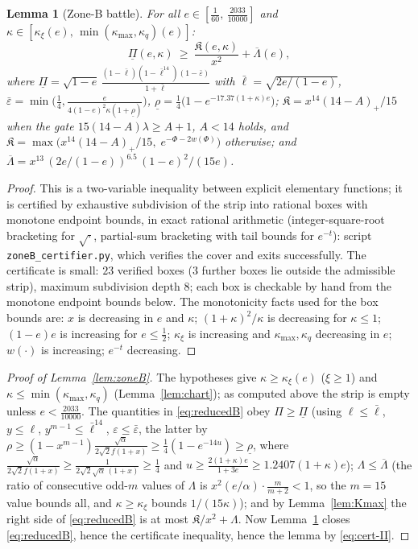 \documentclass[11pt]{article}
\newtheorem{lemma}[theorem]{Lemma}
\newcommand{\eps}{\varepsilon}
\begin{document}
\begin{lemma}[Zone-B battle]\label{lem:zoneB-battle}
For all $e\in[\tfrac1{60},\,\tfrac{2033}{10000}]$ and
$\kappa\in[\kappa_\xi(e),\,\min(\kappa_{\max},\kappa_q)(e)]$:
\begin{equation}\label{eq:B-battle}
        \underline\Pi(e,\kappa)\ \ge\
        \frac{\mathfrak K(e,\kappa)}{x^2}+\overline\Lambda(e),
\end{equation}
where
$\underline\Pi=\sqrt{1-e}\,\frac{(1-\bar\ell)(1-\bar\ell^{14})
(1-\bar\eps)}{1+\bar\ell}$ with $\bar\ell=\sqrt{2e/(1-e)}$,
$\bar\eps=\min\bigl(\tfrac14,\frac{e}{4(1-e)^2\kappa(1+\underline\rho)}\bigr)$,
$\underline\rho=\tfrac14\bigl(1-e^{-17.37(1+\kappa)e}\bigr)$;
$\mathfrak K=x^{14}(14-A)_+/15$ when the gate
$15(14-A)\lambda\ge A+1$, $A<14$ holds, and
$\mathfrak K=\max\bigl(x^{14}(14-A)_+/15,\;e^{-\Phi-2w(\Phi)}\bigr)$
otherwise; and
$\overline\Lambda=x^{13}\,(2e/(1-e))^{6.5}\,(1-e)^2/(15e)$.
\end{lemma}

\begin{proof}
This is a two-variable inequality between explicit elementary functions; it
is certified by exhaustive subdivision of the strip into rational boxes with
monotone endpoint bounds, in exact rational arithmetic (integer-square-root
bracketing for $\sqrt{\cdot}$, partial-sum bracketing with tail bounds for
$e^{-t}$): script \texttt{zoneB\_certifier.py}, which verifies the cover and
exits successfully.  The certificate is small: $23$ verified boxes ($3$
further boxes lie outside the admissible strip), maximum subdivision
depth $8$; each box is checkable by hand from the monotone endpoint bounds
below.
The monotonicity facts used for the box bounds are: $x$ is decreasing in $e$
and $\kappa$; $(1+\kappa)^2/\kappa$ is decreasing for $\kappa\le1$; $(1-e)e$
is increasing for $e\le\tfrac12$; $\kappa_\xi$ is increasing and
$\kappa_{\max},\kappa_q$ decreasing in $e$; $w(\cdot)$ is increasing;
$e^{-t}$ decreasing.
\end{proof}

\begin{proof}[Proof of Lemma~\ref{lem:zoneB}]
The hypotheses give $\kappa\ge\kappa_\xi(e)$ ($\xi\ge1$) and
$\kappa\le\min(\kappa_{\max},\kappa_q)$ (Lemma~\ref{lem:chart}); as computed
above the strip is empty unless $e<\tfrac{2033}{10000}$.  The quantities in
\eqref{eq:reducedB} obey
$\Pi\ge\underline\Pi$ (using $\ell\le\bar\ell$, $y\le\ell$,
$y^{m-1}\le\bar\ell^{14}$, $\eps\le\bar\eps$, the latter by
$\rho\ge(1-x^{m-1})\frac{\sqrt\alpha}{2\sqrt2f(1+x)}
\ge\tfrac14(1-e^{-14u})\ge\underline\rho$, where
$\frac{\sqrt\alpha}{2\sqrt2f(1+x)}\ge\frac1{2\sqrt2\sqrt\alpha\,(1+x)}
\ge\tfrac14$ and $u\ge\frac{2(1+\kappa)e}{1+3e}\ge1.2407(1+\kappa)e$);
$\Lambda\le\overline\Lambda$ (the ratio of consecutive odd-$m$ values of
$\Lambda$ is $x^2(e/\alpha)\cdot\frac m{m+2}<1$, so the $m=15$ value bounds
all, and $\kappa\ge\kappa_\xi$ bounds $1/(15\kappa)$); and by
Lemma~\ref{lem:Kmax} the right side of \eqref{eq:reducedB} is at most
$\mathfrak K/x^2+\Lambda$.  Now Lemma~\ref{lem:zoneB-battle} closes
\eqref{eq:reducedB}, hence the certificate inequality, hence the lemma by
\eqref{eq:cert-II}.
\end{proof}
\end{document}
